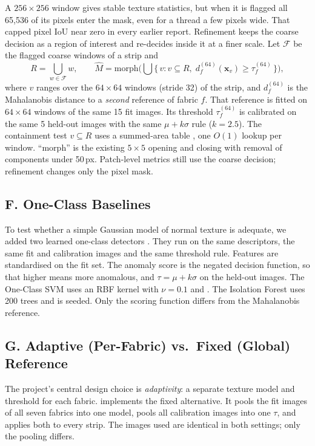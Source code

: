 \documentclass[11pt,a4paper]{article}
\newcommand{\code}[1]{\texttt{\detokenize{#1}}}
\begin{document}
A $256\times256$ window gives stable texture statistics, but when it is flagged all 65{,}536 of its pixels enter the mask, even for a thread a few pixels wide. That capped pixel IoU near zero in every earlier report. Refinement keeps the coarse decision as a region of interest and re-decides inside it at a finer scale. Let $\mathcal{F}$ be the flagged coarse windows of a strip and
\begin{equation}
R=\bigcup_{w\in\mathcal{F}} w,\qquad
\hat{M}=\mathrm{morph}\Big(\bigcup\big\{\,v : v\subseteq R,\; d^{(64)}_f(\mathbf{x}_v)\ge\tau^{(64)}_f\,\big\}\Big),
\label{eq:refine}
\end{equation}
where $v$ ranges over the $64\times64$ windows (stride 32) of the strip, and $d^{(64)}_f$ is the Mahalanobis distance to a \emph{second} reference of fabric $f$. That reference is fitted on $64\times64$ windows of the same 15 fit images. Its threshold $\tau^{(64)}_f$ is calibrated on the same 5 held-out images with the same $\mu+k\sigma$ rule ($k=2.5$). The containment test $v\subseteq R$ uses a summed-area table \cite{crow1984}, one $O(1)$ lookup per window. ``morph'' is the existing $5\times5$ opening and closing with removal of components under 50\,px. Patch-level metrics still use the coarse decision; refinement changes only the pixel mask.

\subsection*{F. One-Class Baselines}

To test whether a simple Gaussian model of normal texture is adequate, we added two learned one-class detectors \cite{scholkopf2001,liu2008}. They run on the same descriptors, the same fit and calibration images and the same threshold rule. Features are standardised on the fit set. The anomaly score is the negated decision function, so that higher means more anomalous, and $\tau=\mu+k\sigma$ on the held-out images. The One-Class SVM uses an RBF kernel with $\nu=0.1$ and \code{gamma="scale"}. The Isolation Forest uses 200 trees and is seeded. Only the scoring function differs from the Mahalanobis reference.

\subsection*{G. Adaptive (Per-Fabric) vs.\ Fixed (Global) Reference}

The project's central design choice is \emph{adaptivity}: a separate texture model and threshold for each fabric. \code{model.reference = "global"} implements the fixed alternative. It pools the fit images of all seven fabrics into one model, pools all calibration images into one $\tau$, and applies both to every strip. The images used are identical in both settings; only the pooling differs.
\end{document}
